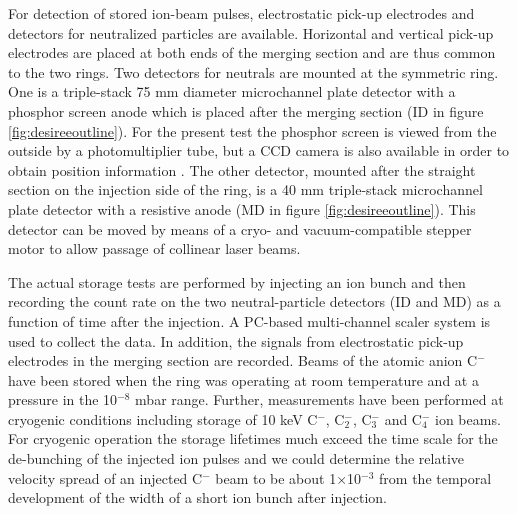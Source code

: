 \documentclass[aps,pra,preprint,superscriptaddress]{revtex4}
\begin{document}
For detection of  stored ion-beam pulses, electrostatic pick-up electrodes and detectors for neutralized particles are available. Horizontal and vertical pick-up electrodes are placed at both ends of the merging section and are thus common to the two rings. Two detectors for neutrals are mounted at the symmetric ring. One is a triple-stack 75 mm diameter microchannel plate detector with a phosphor screen anode which is placed after the merging section (ID in figure \ref{fig:desireeoutline}). For the present test the phosphor screen is viewed from the outside by a photomultiplier tube, but a CCD camera is also available in order to obtain position information \cite{Ros07,Tho08}. The other detector, mounted after the straight section on the injection side of the ring, is a 40 mm triple-stack microchannel plate detector with a resistive anode (MD in figure \ref{fig:desireeoutline}). This detector can be moved by means of a cryo- and vacuum-compatible stepper motor to allow passage of collinear laser beams.

The actual storage tests are performed by injecting an ion bunch and then recording the count rate on the two neutral-particle detectors (ID and MD) as a function of time after the injection. A PC-based multi-channel scaler system is used to collect the data. In addition, the signals from electrostatic pick-up electrodes in the merging section are recorded. Beams of the atomic anion C$^-$ have been stored when the ring was operating at room temperature and at a pressure in the 10$^{-8}$ mbar range. Further, measurements have been performed at cryogenic conditions including storage of 10 keV C$^-$, C$_2^-$, C$_3^-$ and C$_4^-$ ion beams. For cryogenic operation the storage lifetimes much exceed the time scale for the de-bunching of the injected ion pulses and we could determine the relative velocity spread of an injected C$^-$ beam to be about 1$\times$10$^{-3}$ from the temporal development of the width of a short ion bunch after injection.
\end{document}
